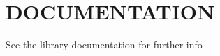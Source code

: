 \section*{D\+O\+C\+U\+M\+E\+N\+T\+A\+T\+I\+ON}

See the library documentation for further info \href{./html/index.html}{\tt } 